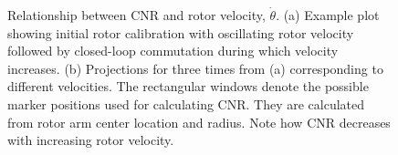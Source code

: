 \documentclass[journal]{IEEEtran}
\begin{document}
\begin{figure}
\begin{center}
\end{center}
\caption{Relationship between CNR and rotor velocity, $\dot{\theta}$. (a) Example plot showing initial rotor calibration with oscillating rotor velocity followed by closed-loop commutation during which velocity increases. (b) Projections for three times from (a) corresponding to different velocities. The rectangular windows denote the possible marker positions used for calculating CNR. They are calculated from rotor arm center location and radius. Note how CNR decreases with increasing rotor velocity. }
\end{figure}
\end{document}
